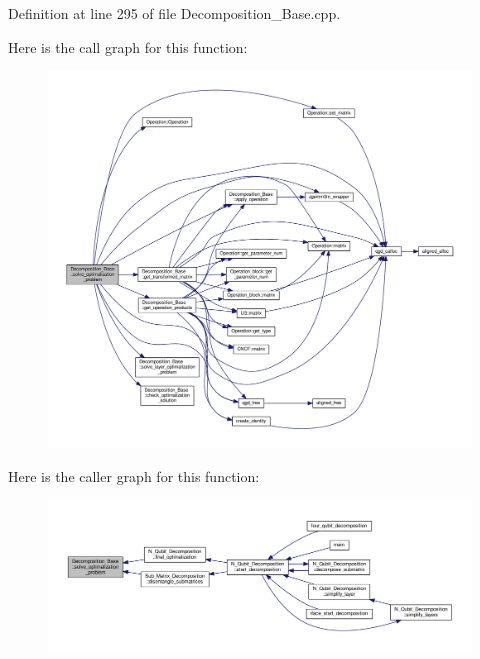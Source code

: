 Definition at line 295 of file Decomposition\+\_\+\+Base.\+cpp.



Here is the call graph for this function\+:
\nopagebreak
\begin{figure}[H]
\begin{center}
\leavevmode
\includegraphics[width=350pt]{class_decomposition___base_ae21ecd8c5016a6ec942330247e8cdebc_cgraph}
\end{center}
\end{figure}




Here is the caller graph for this function\+:
\nopagebreak
\begin{figure}[H]
\begin{center}
\leavevmode
\includegraphics[width=350pt]{class_decomposition___base_ae21ecd8c5016a6ec942330247e8cdebc_icgraph}
\end{center}
\end{figure}


